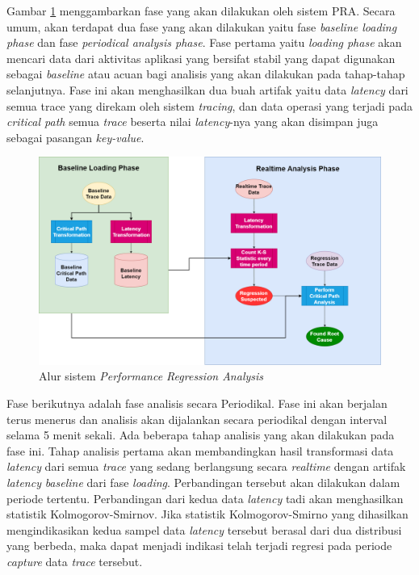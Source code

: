 Gambar \ref{alur-pra} menggambarkan fase yang akan dilakukan oleh sistem PRA. Secara umum, akan terdapat dua fase yang akan dilakukan yaitu fase \textit{baseline loading phase} dan fase \textit{periodical analysis phase}. Fase pertama yaitu \textit{loading phase} akan mencari data dari aktivitas aplikasi yang bersifat stabil yang dapat digunakan sebagai \textit{baseline} atau acuan bagi analisis yang akan dilakukan pada tahap-tahap selanjutnya. Fase ini akan menghasilkan dua buah artifak yaitu data \textit{latency} dari semua trace yang direkam oleh sistem \textit{tracing}, dan data operasi yang terjadi pada \textit{critical path} semua \textit{trace} beserta nilai \textit{latency}-nya yang akan disimpan juga sebagai pasangan \textit{key-value}. 
\begin{figure}[!htb]
	\centering
	\includegraphics[width=1\textwidth,scale=5]{resources/ch3/alur_v2.png}
	\caption{Alur sistem \textit{Performance Regression Analysis}}
	\label{alur-pra}
\end{figure}

Fase berikutnya adalah fase analisis secara Periodikal. Fase ini akan berjalan terus menerus dan analisis akan dijalankan secara periodikal dengan interval selama 5 menit sekali. Ada beberapa tahap analisis yang akan dilakukan pada fase ini.  Tahap analisis pertama akan membandingkan hasil transformasi data \textit{latency} dari semua \textit{trace} yang sedang berlangsung secara \textit{realtime} dengan artifak \textit{latency} \textit{baseline} dari fase \textit{loading}. Perbandingan tersebut akan dilakukan dalam periode tertentu. Perbandingan dari kedua data \textit{latency} tadi akan menghasilkan statistik Kolmogorov-Smirnov. Jika statistik Kolmogorov-Smirno yang dihasilkan mengindikasikan kedua sampel data \textit{latency} tersebut berasal dari dua distribusi yang berbeda, maka dapat menjadi indikasi telah terjadi regresi pada periode \textit{capture} data \textit{trace} tersebut. 

